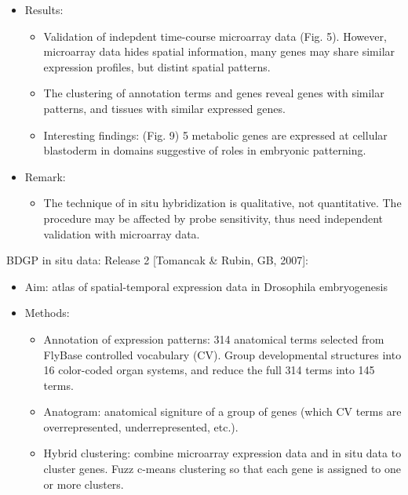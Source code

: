 \documentclass{report}
\begin{document}
\begin{enumerate}
\begin{itemize}
		\item Results: 
		\begin{itemize}
			\item Validation of indepdent time-course microarray data (Fig. 5). However, microarray data hides spatial information, many genes may share similar expression profiles, but distint spatial patterns. 
			\item The clustering of annotation terms and genes reveal genes with similar patterns, and tissues with similar expressed genes. 
			\item Interesting findings: (Fig. 9) 5 metabolic genes are expressed at cellular blastoderm in domains suggestive of roles in embryonic patterning. 
		\end{itemize}
		
		\item Remark: 
		\begin{itemize}
			\item The technique of in situ hybridization is qualitative, not quantitative. The procedure may be affected by probe sensitivity, thus need independent validation with microarray data. 
		\end{itemize}
	\end{itemize}
	
	BDGP in situ data: Release 2 [Tomancak \& Rubin, GB, 2007]:
	\begin{itemize}
		\item Aim: atlas of spatial-temporal expression data in Drosophila embryogenesis
		
		\item Methods: 
		\begin{itemize}
			\item Annotation of expression patterns: 314 anatomical terms selected from FlyBase controlled vocabulary (CV). Group developmental structures into 16 color-coded organ systems, and reduce the full 314 terms into 145 terms. 
			\item Anatogram: anatomical signiture of a group of genes (which CV terms are overrepresented, underrepresented, etc.). 
			\item Hybrid clustering: combine microarray expression data and in situ data to cluster genes. Fuzz c-means clustering so that each gene is assigned to one or more clusters. 
		\end{itemize}
		

\end{itemize}
\end{enumerate}
\end{document}
